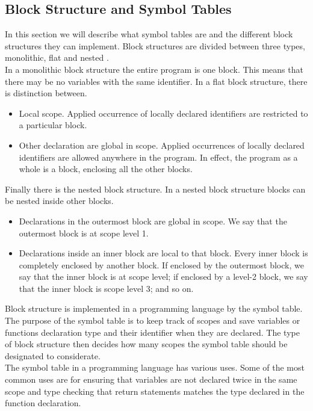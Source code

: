 \subsection{Block Structure and Symbol Tables}\label{Block_Structure_Symbol_Tables}
In this section we will describe what symbol tables are and the different block structures they can implement.
Block structures are divided between three types, monolithic, flat and nested \cite{compilers-and-intepreters}. \\ %
In a monolithic block structure the entire program is one block. This means that there may be no variables with the same identifier.
In a flat block structure, there is distinction between.
\begin{itemize}
    \item Local scope. Applied occurrence of locally declared identifiers are restricted to a particular block.
    \item Other declaration are global in scope. Applied occurrences of locally declared identifiers are allowed anywhere in the program. 
    In effect, the program as a whole is a block, enclosing all the other blocks.
\end{itemize}
Finally there is the nested block structure. In a nested block structure blocks can be nested inside other blocks. 
\begin{itemize}
    \item Declarations in the outermost block are global in scope. We say that the outermost block is at scope level 1.
    \item Declarations inside an inner block are local to that block. Every inner block is completely enclosed by another block. If enclosed by the outermost block, we say that the inner block is at scope level; if enclosed by a level-2 block, we say that the inner block is scope level 3; and so on.
\end{itemize}
Block structure is implemented in a programming language by the symbol table. The purpose of the symbol table is to keep track of scopes and save variables or functions declaration type and their identifier when they are declared. The type of block structure then decides how many scopes the symbol table should be designated to considerate.\\
The symbol table in a programming language has various uses. Some of the most common uses are for ensuring that variables are not declared twice in the same scope and type checking that return statements matches the type declared in the function declaration.

